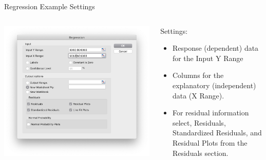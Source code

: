 \documentclass[xcolor=svgnames]{beamer}
\begin{document}
\begin{frame}[label=current]{Regression Example Settings}
\begin{columns}[T] %
\begin{column}{.6\textwidth}
\includegraphics[height=.6\textheight]{RegressionSettings}
\end{column}%
\hfill%
\begin{column}{.5\textwidth}
Settings:
\begin{itemize}
\item Response (dependent) data for the Input Y Range
\item Columns for the explanatory (independent) data (X Range). 
\item For residual information select, Residuals, Standardized Residuals, and Residual Plots from the Residuals section. 
\end{itemize}
\end{column}%
\end{columns}
\end{frame}
\end{document}
